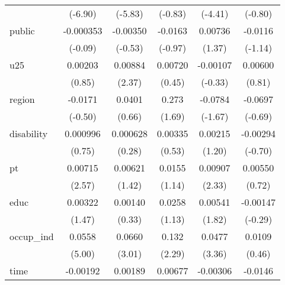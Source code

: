 {\begin{longtable}{l*{5}{c}}
            &     (-6.90)         &     (-5.83)         &     (-0.83)         &     (-4.41)         &     (-0.80)         \\
public      &   -0.000353         &    -0.00350         &     -0.0163         &     0.00736         &     -0.0116         \\
            &     (-0.09)         &     (-0.53)         &     (-0.97)         &      (1.37)         &     (-1.14)         \\
u25         &     0.00203         &     0.00884\sym{*}  &     0.00720         &    -0.00107         &     0.00600         \\
            &      (0.85)         &      (2.37)         &      (0.45)         &     (-0.33)         &      (0.81)         \\
region      &     -0.0171         &      0.0401         &       0.273         &     -0.0784         &     -0.0697         \\
            &     (-0.50)         &      (0.66)         &      (1.69)         &     (-1.67)         &     (-0.69)         \\
disability  &    0.000996         &    0.000628         &     0.00335         &     0.00215         &    -0.00294         \\
            &      (0.75)         &      (0.28)         &      (0.53)         &      (1.20)         &     (-0.70)         \\
pt          &     0.00715\sym{*}  &     0.00621         &      0.0155         &     0.00907\sym{*}  &     0.00550         \\
            &      (2.57)         &      (1.42)         &      (1.14)         &      (2.33)         &      (0.72)         \\
educ        &     0.00322         &     0.00140         &      0.0258         &     0.00541         &    -0.00147         \\
            &      (1.47)         &      (0.33)         &      (1.13)         &      (1.82)         &     (-0.29)         \\
occup\_ind   &      0.0558\sym{***}&      0.0660\sym{**} &       0.132\sym{*}  &      0.0477\sym{***}&      0.0109         \\
            &      (5.00)         &      (3.01)         &      (2.29)         &      (3.36)         &      (0.46)         \\
time        &    -0.00192         &     0.00189         &     0.00677         &    -0.00306         &     -0.0146\sym{**} \\

\end{longtable}}
